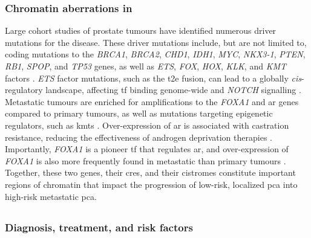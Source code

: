 \subsubsection{Chromatin aberrations in }

Large cohort studies of prostate tumours have identified numerous driver mutations for the disease.
These driver mutations include, but are not limited to, coding mutations to the \emph{BRCA1}, \emph{BRCA2}, \emph{CHD1}, \emph{IDH1}, \emph{MYC}, \emph{NKX3-1}, \emph{PTEN}, \emph{RB1}, \emph{SPOP}, and \emph{TP53} genes, as well as \emph{ETS}, \emph{FOX}, \emph{HOX}, \emph{KLK}, and \emph{KMT} factors \cite{fraserGenomicHallmarksLocalized2017,pcf/su2cinternationalprostatecancerdreamteamLongTailOncogenic2018,abeshouseMolecularTaxonomyPrimary2015}.
\emph{ETS} factor mutations, such as the \gls{t2e} fusion, can lead to a globally \emph{cis}-regulatory landscape, affecting \gls{tf} binding genome-wide and \emph{NOTCH} signalling \cite{kronTMPRSS2ERGFusion2017}.
Metastatic tumours are enriched for amplifications to the \emph{FOXA1} and \gls{ar} genes compared to primary tumours, as well as mutations targeting epigenetic regulators, such as \glspl{kmt} \cite{grassoMutationalLandscapeLethal2012,robinsonIntegrativeClinicalGenomics2015,quigleyGenomicHallmarksStructural2018}.
Over-expression of \gls{ar} is associated with castration resistance, reducing the effectiveness of androgen deprivation therapies \cite{}.
Importantly, \emph{FOXA1} is a pioneer \gls{tf} that regulates \gls{ar}, and over-expression of \emph{FOXA1} is also more frequently found in metastatic than primary tumours \cite{tengPioneerProstateCancer2021}.
Together, these two genes, their \glspl{cre}, and their cistromes constitute important regions of chromatin that impact the progression of low-risk, localized \gls{pca} into high-risk metastatic \gls{pca}.

\subsection{}

\subsubsection{Diagnosis, treatment, and risk factors}

